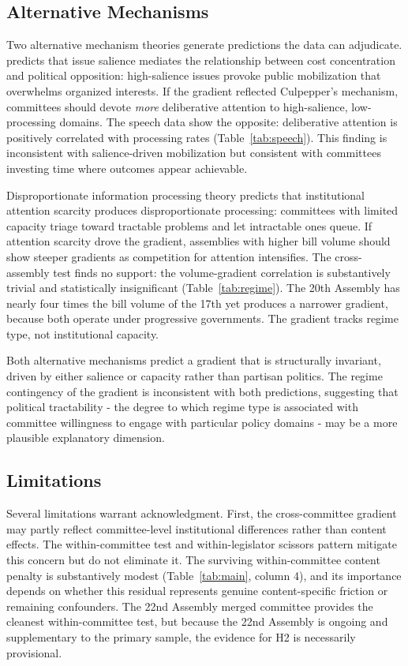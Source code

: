 \documentclass[11pt]{article}
\begin{document}
\subsection{Alternative Mechanisms}

Two alternative mechanism theories generate predictions the data can adjudicate. \citet{culpepper2011} predicts that issue salience mediates the relationship between cost concentration and political opposition: high-salience issues provoke public mobilization that overwhelms organized interests. If the gradient reflected Culpepper's mechanism, committees should devote \emph{more} deliberative attention to high-salience, low-processing domains. The speech data show the opposite: deliberative attention is positively correlated with processing rates (Table~\ref{tab:speech}). This finding is inconsistent with salience-driven mobilization but consistent with committees investing time where outcomes appear achievable.

Disproportionate information processing theory \citep{jones2004,jones2005} predicts that institutional attention scarcity produces disproportionate processing: committees with limited capacity triage toward tractable problems and let intractable ones queue. If attention scarcity drove the gradient, assemblies with higher bill volume should show steeper gradients as competition for attention intensifies. The cross-assembly test finds no support: the volume-gradient correlation is substantively trivial and statistically insignificant (Table~\ref{tab:regime}). The 20th Assembly has nearly four times the bill volume of the 17th yet produces a narrower gradient, because both operate under progressive governments. The gradient tracks regime type, not institutional capacity.

Both alternative mechanisms predict a gradient that is structurally invariant, driven by either salience or capacity rather than partisan politics. The regime contingency of the gradient is inconsistent with both predictions, suggesting that political tractability - the degree to which regime type is associated with committee willingness to engage with particular policy domains - may be a more plausible explanatory dimension.

\subsection{Limitations}

Several limitations warrant acknowledgment. First, the cross-committee gradient may partly reflect committee-level institutional differences rather than content effects. The within-committee test and within-legislator scissors pattern mitigate this concern but do not eliminate it. The surviving within-committee content penalty is substantively modest (Table~\ref{tab:main}, column 4), and its importance depends on whether this residual represents genuine content-specific friction or remaining confounders. The 22nd Assembly merged committee provides the cleanest within-committee test, but because the 22nd Assembly is ongoing and supplementary to the primary sample, the evidence for H2 is necessarily provisional.
\end{document}
